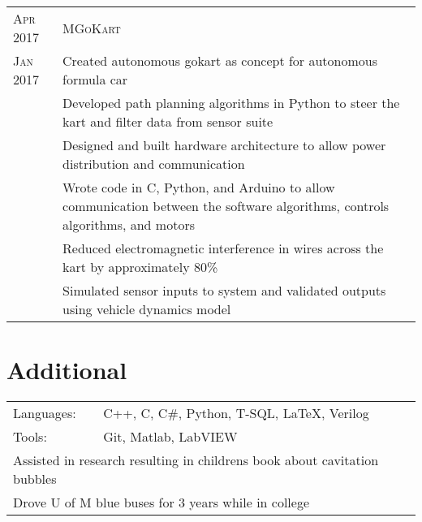 \documentclass[a4paper,12pt]{article} %
\begin{document}

\begin{tabular}{R{2.1cm}|p{14cm}}
\hspace{4pt}\textsc{Apr 2017} & \textsc{MGoKart} \\
\textsc{Jan 2017} & \footnotesize{Created autonomous gokart as concept for
  autonomous formula car} \\
& \footnotesize{Developed path planning algorithms in Python to steer the kart
  and filter data from sensor suite} \\
& \footnotesize{Designed and built hardware architecture to allow power
  distribution and communication} \\
& \footnotesize{Wrote code in C, Python, and Arduino to allow communication
  between the software algorithms, controls algorithms, and motors} \\
& \footnotesize{Reduced electromagnetic interference in wires across the kart by
  approximately 80\%} \\
& \footnotesize{Simulated sensor inputs to system and validated outputs using
  vehicle dynamics model} \\
\end{tabular}


\section{Additional}

\begin{tabular}{ll}
Languages: & C++, C, C\#, Python, T-SQL, \LaTeX, Verilog \\
Tools: & Git, Matlab, LabVIEW \\
\multicolumn{2}{l}{Assisted in research resulting in childrens book about
  cavitation bubbles}\\
\multicolumn{2}{l}{Drove U of M blue buses for 3 years while in college}\\
\end{tabular}

\clearpage %

\end{document}
